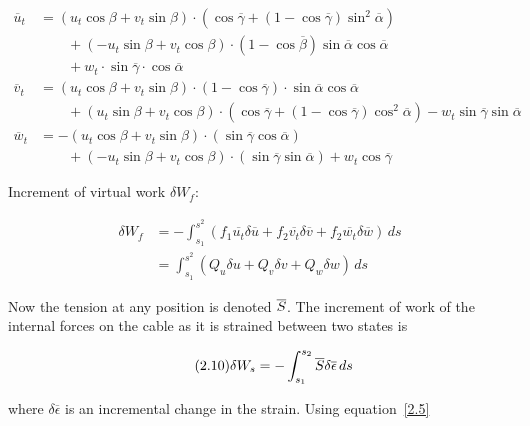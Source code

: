 \documentclass{article}
\begin{document}
\begin{align}
  \overline{u}_t &= \tag{2.8a}\label{2.8a}
  \left(u_t\cos\beta + v_t\sin\beta\right)\cdot
  \left(\cos\overline{\gamma}+(1-\cos\overline{\gamma})\sin^2\overline{\alpha}\right)\nonumber\\
  &{\qquad} +
  \left(-u_t\sin\beta + v_t\cos\beta\right)\cdot
  \left(1-\cos\overline{\beta}\right)\sin\overline{\alpha}\cos\overline{\alpha}\nonumber\\
  &{\qquad} +
  w_t\cdot\sin\overline{\gamma}\cdot\cos\overline{\alpha}\nonumber\\
  \overline{v}_t &= \tag{2.8b}\label{2.8b}
  \left(u_t\cos\beta + v_t\sin\beta\right)\cdot\left(1-\cos\overline{\gamma}\right)\cdot
  \sin\overline{\alpha}\cos\overline{\alpha}\nonumber\\
  &{\qquad} +
  (u_t\sin\beta + v_t\cos\beta)\cdot\left(\cos\overline{\gamma} + (1-\cos\overline{\gamma})
  \cos^2\overline{\alpha}\right) - w_t\sin\overline{\gamma}\sin\overline{\alpha}\nonumber\\
  \overline{w}_t &= \tag{2.8c}\label{2.8c}
  -\left(u_t\cos\beta + v_t\sin\beta\right)\cdot
  (\sin\overline{\gamma}\cos\overline{\alpha})\nonumber\\
  &{\qquad} +
  (-u_t\sin\beta + v_t\cos\beta)\cdot\left(\sin\overline{\gamma}\sin\overline{\alpha}\right) +
  w_t\cos\overline{\gamma}\nonumber
\end{align}

Increment of virtual work $\delta W_f$:

\begin{align}\tag{2.9}\label{2.9}
  \delta W_f &= -\int_{s_1}^{s^2}
  \left(
  f_1\overline{u_t}\delta\overline{u} +
  f_2\overline{v_t}\delta\overline{v} +
  f_2\overline{w_t}\delta\overline{w}
  \right)\,ds\\
  &=   \int_{s_1}^{s^2}
  \left(\tag{2.9b}\label{2.9b}
  Q_u\delta u +Q_v\delta v+Q_w\delta w\right)\,ds
  \end{align}



Now the tension at any position is denoted $\overline{S}$.  The increment of
work of the internal forces on the cable as it is strained between two
states is

\begin{equation}\tag{2.10}\label{2.10}
  \delta W_s= -\int_{s_1}^{s_2}\overline{S}\delta\overline{\epsilon}\,ds
\end{equation}

where $\delta\overline{\epsilon}$ is an incremental change in the
strain.  Using equation~\ref{2.5}
\end{document}
